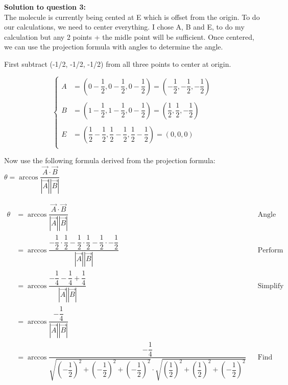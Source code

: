 \documentclass[12pt]{book}
\begin{document}
\begin{enumerate}
\vspace{0.3cm} 
\textbf{Solution to question 3:}\\
 The molecule is currently being cented at E which is offset from the 
 origin. To do our calculations, we need to center everything. I chose 
 A, B and E, to do my calculation but any 2 points + the midle point will be 
 sufficient. Once centered, we can use the projection formula with angles to 
 determine the angle.
\vspace{0.3cm}

First subtract (-1/2, -1/2, -1/2) from all three points to center at origin.

\[ \begin{cases} 
  A & = \left( 0-\dfrac{1}{2}, 0-\dfrac{1}{2}, 0-\dfrac{1}{2} \right) = \left( -\dfrac{1}{2}, -\dfrac{1}{2}, -\dfrac{1}{2} \right) \\
  & \\
  B & = \left( 1-\dfrac{1}{2}, 1-\dfrac{1}{2}, 0-\dfrac{1}{2} \right) = \left( \dfrac{1}{2}, \dfrac{1}{2}, -\dfrac{1}{2} \right) \\
  & \\
  E & = \left( \dfrac{1}{2}-\dfrac{1}{2}, \dfrac{1}{2}-\dfrac{1}{2}, \dfrac{1}{2}-\dfrac{1}{2} \right) = ( 0, 0, 0 ) \\
\end{cases}
\]

Now use the following formula derived from the projection formula: $\theta = \arccos \dfrac{\vec{A} \cdot \vec{B}}{|\vec{A}||\vec{B}|}$

\addtolength{\jot}{1em}
\begin{align*}
  \theta &= \arccos \dfrac{\vec{A} \cdot \vec{B}}{|\vec{A}||\vec{B}|} && \text{Angle Projection Formula} \\
  &= \arccos \dfrac{-\dfrac{1}{2}\cdot\dfrac{1}{2} -\dfrac{1}{2}\cdot\dfrac{1}{2} -\dfrac{1}{2}\cdot-\dfrac{1}{2}}{|\vec{A}||\vec{B}|} && \text{Perform dot product} \\
  &= \arccos \dfrac{-\dfrac{1}{4} -\dfrac{1}{4} +\dfrac{1}{4}}{|\vec{A}||\vec{B}|} && \text{Simplify} \\
  &= \arccos \dfrac{-\dfrac{1}{4}}{|\vec{A}||\vec{B}|} \\
  &= \arccos \dfrac{-\dfrac{1}{4}}{\sqrt{\left(-\dfrac{1}{2} \right)^2 + \left(-\dfrac{1}{2} \right)^2 + \left(-\dfrac{1}{2} \right)^2} \cdot \sqrt{\left(\dfrac{1}{2} \right)^2 + \left(\dfrac{1}{2} \right)^2 + \left(-\dfrac{1}{2} \right)^2}} && \text{Find scalar of A and B} \\
\end{align*}


\end{enumerate}
\end{document}
